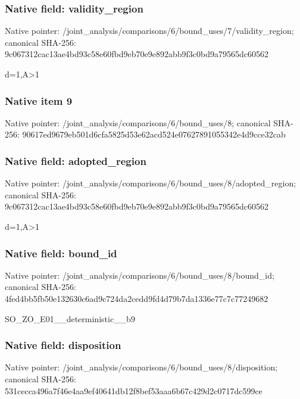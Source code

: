 \documentclass[10pt,a4paper]{article}
\begin{document}
\subsubsection{Native field: validity\_\allowbreak{}region}
Native pointer: /joint\_\allowbreak{}analysis/comparisons/6/bound\_\allowbreak{}uses/7/validity\_\allowbreak{}region; canonical SHA-256: 9c067312cac13ae4bd93c58e60fbd9eb70e9e892abb9f3c0bd9a79565dc60562

\begingroup\raggedright\sloppy d=\allowbreak{}1,\allowbreak{}A>1\par\endgroup

\subsubsection{Native item 9}
Native pointer: /joint\_\allowbreak{}analysis/comparisons/6/bound\_\allowbreak{}uses/8; canonical SHA-256: 90617ed9679eb501d6cfa5825d53e62acd524e07627891055342e4d9cce32cab

\subsubsection{Native field: adopted\_\allowbreak{}region}
Native pointer: /joint\_\allowbreak{}analysis/comparisons/6/bound\_\allowbreak{}uses/8/adopted\_\allowbreak{}region; canonical SHA-256: 9c067312cac13ae4bd93c58e60fbd9eb70e9e892abb9f3c0bd9a79565dc60562

\begingroup\raggedright\sloppy d=\allowbreak{}1,\allowbreak{}A>1\par\endgroup

\subsubsection{Native field: bound\_\allowbreak{}id}
Native pointer: /joint\_\allowbreak{}analysis/comparisons/6/bound\_\allowbreak{}uses/8/bound\_\allowbreak{}id; canonical SHA-256: 4fed4bb5fb50e132630c6ad9c724da2cedd9fd4d79b7da1336e77c7c77249682

\begingroup\raggedright\sloppy SO\_\allowbreak{}ZO\_\allowbreak{}E01\_\allowbreak{}\_\allowbreak{}deterministic\_\allowbreak{}\_\allowbreak{}b9\par\endgroup

\subsubsection{Native field: disposition}
Native pointer: /joint\_\allowbreak{}analysis/comparisons/6/bound\_\allowbreak{}uses/8/disposition; canonical SHA-256: 531cecca496a7f46e4aa9ef40641db12f8bef53aaa6b67c429d2c0717dc599ce
\end{document}
